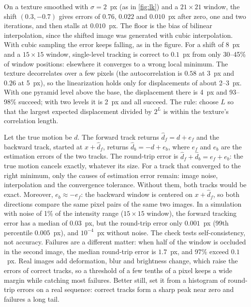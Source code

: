 \begin{solutions}
  \item On a texture smoothed with $\sigma = 2$~px (as in \cref{fig:lk}) and a $21\times21$ window, the shift $(0.3, -0.7)$ gives errors of $0.76$, $0.022$ and $0.010$~px after
        zero, one and two iterations, and then stalls at $0.010$~px. The floor is the bias of bilinear interpolation, since the shifted image was generated with
        cubic interpolation. With cubic sampling the error keeps falling, as in the figure. For a shift of 8~px and a $15\times15$ window, single-level tracking is correct to
        $0.1$~px from only 30--45\% of window positions: elsewhere it converges to a wrong local minimum. The texture decorrelates over a few pixels (the
        autocorrelation is $0.58$ at 3~px and $0.26$ at 5~px), so the linearization holds only for displacements of about 2--3~px. With one pyramid level above the
        base, the displacement there is 4~px and 93--98\% succeed; with two levels it is 2~px and all succeed. The rule: choose $L$ so that the largest expected
        displacement divided by $2^L$ is within the texture's correlation length.

  \item Let the true motion be $d$. The forward track returns $\hat d_f = d + e_f$ and the backward track, started at $x + \hat d_f$, returns $\hat d_b = -d + e_b$, where $e_f$ and $e_b$
        are the estimation errors of the two tracks. The round-trip error is $\hat d_f + \hat d_b = e_f + e_b$: the true motion cancels exactly, whatever its size. For a track
        that converged to the right minimum, only the causes of estimation error remain: image noise, interpolation and the convergence tolerance. Without them,
        both tracks would be exact. Moreover, $e_b \approx -e_f$: the backward window is centered on $x + \hat d_f$, so both directions compare the same pixel pairs of
        the same two images. In a simulation with noise of 1\% of the intensity range ($15\times15$ window), the forward tracking error has a median of $0.03$~px,
        but the round-trip error only $0.001$~px (99th percentile $0.005$~px), and $10^{-4}$~px without noise. The check tests self-consistency, not accuracy. Failures are a different matter: when half of the window is occluded in the
        second image, the median round-trip error is $1.7$~px, and 97\% exceed $0.1$~px. Real images add deformation, blur and brightness change, which
        raise the errors of correct tracks, so a threshold of a few tenths of a pixel keeps a wide margin while catching most failures. Better still, set it
        from a histogram of round-trip errors on a real sequence: correct tracks form a sharp peak near zero and failures a long tail.


\end{solutions}
